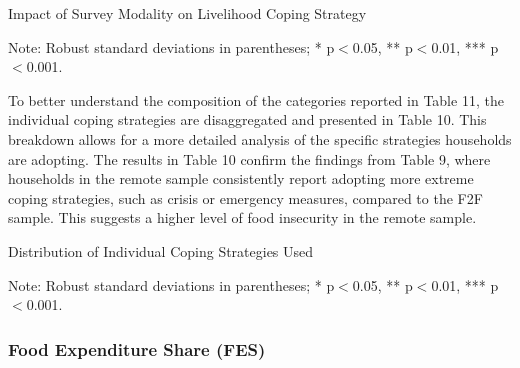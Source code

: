 \documentclass[11pt,harvard]{article}
\begin{document}
	\begin{table}[htbp]
		\centering
		\begin{adjustbox}{max width=\textwidth}
			\begin{threeparttable}
				\caption{Impact of Survey Modality on Livelihood Coping Strategy}
				\footnotesize
				 
				\label{tab:LCS_Modality_BF}
				\begin{tablenotes}
					\item Note: Robust standard deviations in parentheses; * p$<$0.05, ** p$<$0.01, *** p$<$0.001. 
				\end{tablenotes}
			\end{threeparttable}
		\end{adjustbox}
	\end{table}
	
	To better understand the composition of the categories reported in Table 11, the individual coping strategies are disaggregated and presented in Table 10. This breakdown allows for a more detailed analysis of the specific strategies households are adopting. The results in Table 10 confirm the findings from Table 9, where households in the remote sample consistently report adopting more extreme coping strategies, such as crisis or emergency measures, compared to the F2F sample. This suggests a higher level of food insecurity in the remote sample.
	
	\begin{table}[htbp]
		\centering
		\begin{adjustbox}{max width=\textwidth}
			\begin{threeparttable}
				\caption{Distribution of Individual Coping Strategies Used}
				\footnotesize
				 
				\label{tab:LCS_Ind_Modality_BF}
				\begin{tablenotes}
					\item Note: Robust standard deviations in parentheses; * p$<$0.05, ** p$<$0.01, *** p$<$0.001.
				\end{tablenotes}
			\end{threeparttable}
		\end{adjustbox}
	\end{table}
	
	
	\subsubsection{Food Expenditure Share (FES)}
	
\end{document}

